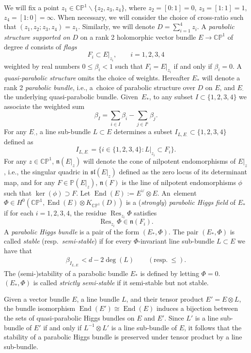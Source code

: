 \documentclass[10pt,a4paper]{amsart}
\newcommand{\field}[1]{\ensuremath{\mathbb{#1}}}
\newcommand{\CC}{\field{C}}
\newcommand{\PP}{\field{P}}
\newcommand{\qp}{\boldsymbol{\cdot}}
\DeclareMathOperator{\End}{End}
\DeclareMathOperator{\Res}{Res}
\numberwithin{equation}{section}
\begin{document}
We will fix a point $z_{1}\in\CC\PP^{1}\backslash\{z_{2},z_{3},z_{4}\}$, where $z_{2}=[0:1]=0$, $z_{3}=[1:1]=1$, $z_{4}=[1:0]=\infty$. When necessary, we will consider the choice of cross-ratio such that $(z_{1},z_{2};z_{3},z_{4})=z_{1}$. Similarly, we will denote $D = \sum_{i=1}^{4}z_{i}$. A \emph{parabolic structure supported on $D$} on a rank 2 holomorphic vector bundle $E\rightarrow \CC\PP^{1}$ of degree $d$ consists of \emph{flags}
\[
F_{i} \subset E|_{z_{i}},\qquad i=1,2,3, 4
\]
weighted by real numbers $0\leq \beta_{i}<1$ such that $F_{i} = E\vert_{z_{i}}$ if and only if $\beta_{i}=0$. A \emph{quasi-parabolic structure} omits the choice of weights. Hereafter $E_{*}$ will denote a rank 2 \emph{parabolic bundle}, i.e., a~choice of parabolic structure over $D$ on $E$, and $E_{\qp}$ the underlying quasi-parabolic bundle. Given~$E_{*}$, to any subset $I\subset\{1,2,3,4\}$ we associate the weighted sum
\[
\beta_{I} = \sum_{i\in I}\beta_{i} - \sum_{j\in I^{\mathsf{c}}}\beta_{j}.
\]
For any $E_{\qp}$, a line sub-bundle $L\subset E$ determines a subset $I_{L,E_{\qp}}\subset \{1,2,3,4\}$ defined as
\[
I_{L,E_{\qp}} = \bigl\{i\in\{1,2,3,4\}\colon L|_{z_{i}} \subset F_{i}\bigr\}.
\]
For any $z\in\CC\PP^{1}$, $\mathfrak{n}(E\vert_{z})$ will denote the cone of nilpotent endomorphisms of $E\vert_{z}$, i.e., the singular quadric in $\mathfrak{sl}(E|_{z})$ defined as the zero locus of its determinant map, and for any $F\in\PP(E\vert_{z})$, $\mathfrak{n}(F)$ is the line of nilpotent endomorphisms $\phi$ such that $\ker(\phi) \supset F$.
Let $\End (E):=E^{\vee}\otimes E$. An~element $\Phi\in H^{0}(\CC\PP^{1},\End (E)\otimes K_{\CC\PP^{1}}(D))$ is a (\textit{strongly}) \textit{parabolic Higgs field} of $E_{*}$ if for each $i=1,2,3,4$, the residue $\Res_{z_{i}}\Phi$ satisfies
\[
\Res_{z_{i}}\Phi\in\mathfrak{n}(F_{i}).
\]
A \emph{parabolic Higgs bundle} is a pair of the form $(E_{*},\Phi)$. The pair $(E_{*},\Phi)$ is called \emph{stable} (resp.~\textit{semi-stable}) if for every $\Phi$-invariant line sub-bundle $L\subset E$ we have that
\begin{gather}\label{eq:effective}
\beta_{I_{L,E_{\qp}}} < d - 2\deg(L)\qquad (\text{resp.}~\leq).
\end{gather}
The (semi-)stability of a parabolic bundle $E_{*}$ is defined by letting $\Phi= 0$. $(E_{*},\Phi)$ is called \textit{strictly semi-stable} if it semi-stable but not stable.

Given a vector bundle $E$, a line bundle $L$, and their tensor product $E' = E\otimes L$, the bundle isomorphism $\End(E')\cong \End (E)$ induces a bijection between the sets of quasi-parabolic Higgs bundles on $E$ and $E'$. Since $L'$ is a line sub-bundle of $E'$ if and only if $L^{-1}\otimes L'$ is a line sub-bundle of $E$, it follows that the stability of a parabolic Higgs bundle is preserved under tensor product by a line sub-bundle.
\end{document}
